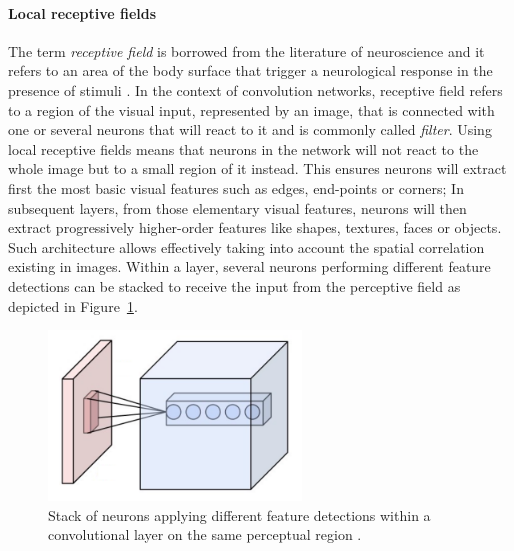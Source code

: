 \paragraph{Local receptive fields}
The term \emph{receptive field} is borrowed from the literature of neuroscience and it refers to an area of the body surface that trigger a neurological response in the presence of stimuli \cite{Sherrington1906,Alonso2008}.
In the context of convolution networks, receptive field refers to a region of the visual input, represented by an image, that is connected with one or several neurons that will react to it and is commonly called \emph{filter}.
Using local receptive fields means that neurons in the network will not react to the whole image but to a small region of it instead.
This ensures neurons will extract first the most basic visual features such as edges, end-points or corners;
In subsequent layers, from those elementary visual features, neurons will then extract progressively higher-order features like shapes, textures, faces or objects.
Such architecture allows effectively taking into account the spatial correlation existing in images.
Within a layer, several neurons performing different feature detections can be stacked to receive the input from the perceptive field as depicted in Figure~\ref{fig:sec:theory:convnets:conv-layer-1}.

\begin{figure}[htb]
  \begin{center}
    \includegraphics[width=0.6\textwidth]{gfx/conv-layer-1}
  \end{center}
  \caption{Stack of neurons applying different feature detections within a convolutional layer on the same perceptual region \cite{Aphex342015}.}
  \label{fig:sec:theory:convnets:conv-layer-1}
\end{figure}

